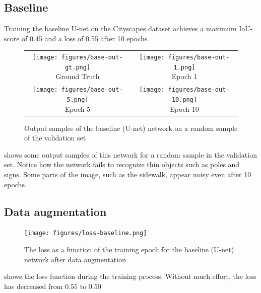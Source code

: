 \subsection{Baseline}
Training the baseline U-net on the Cityscapes dataset achieves a maximum IoU-score of 0.45 and a loss of 0.55 after 10 epochs.

\begin{figure}
	\centering
	\begin{tabular}{cc}
		\makecell{
			\texttt{[image: figures/base-out-gt.png]} \\
			Ground Truth 
		} &
		\makecell{
			\texttt{[image: figures/base-out-1.png]} \\
			Epoch 1
		} \\
		\makecell{
			\texttt{[image: figures/base-out-5.png]} \\
			Epoch 5
		} &
		\makecell {
			\texttt{[image: figures/base-out-10.png]} \\
			Epoch 10
		} \\ 
		
	\end{tabular}
	\caption{Output samples of the baseline (U-net) network on a random sample of the validation set}    
	\label{fig:res-out-baseline}
\end{figure}

 shows some output samples of this network for a random sample in the validation set. Notice how the network fails to recognize thin objects such as poles and signs. Some parts of the image, such as the sidewalk, appear noisy even after 10 epochs.

\subsection{Data augmentation}
\begin{figure}
	\centering
	\texttt{[image: figures/loss-baseline.png]}
	\caption{The loss as a function of the training epoch for the baseline (U-net) network after data augmentation}
	\label{fig:res-loss-baseline}
\end{figure}


 shows the loss function during the training process. Without much effort, the loss has decreased from $0.55$ to $0.50$

